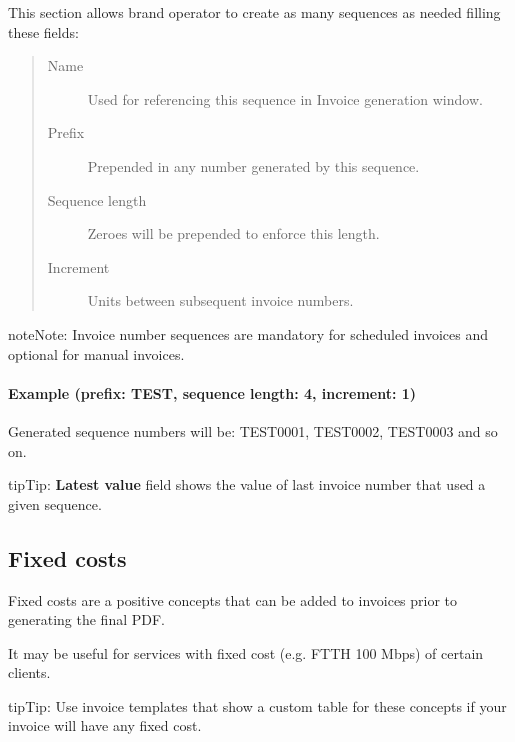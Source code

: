 \documentclass[letterpaper,10pt,english]{sphinxmanual}
\begin{document}
This section allows brand operator to create as many sequences as needed filling these fields:
\begin{quote}
\begin{description}
\item[{Name}] \leavevmode
Used for referencing this sequence in Invoice generation window.

\item[{Prefix}] \leavevmode
Prepended in any number generated by this sequence.

\item[{Sequence length}] \leavevmode
Zeroes will be prepended to enforce this length.

\item[{Increment}] \leavevmode
Units between subsequent invoice numbers.

\end{description}
\end{quote}

\begin{notice}{note}{Note:}
Invoice number sequences are mandatory for scheduled invoices and optional for manual invoices.
\end{notice}
\paragraph{Example (prefix: TEST, sequence length: 4, increment: 1)}

Generated sequence numbers will be: TEST0001, TEST0002, TEST0003 and so on.

\begin{notice}{tip}{Tip:}
\textbf{Latest value} field shows the value of last invoice number that used a given sequence.
\end{notice}


\subsection{Fixed costs}
\label{administration_portal/brand/invoicing/fixed_costs:fixed-costs}\label{administration_portal/brand/invoicing/fixed_costs::doc}\label{administration_portal/brand/invoicing/fixed_costs:id1}
Fixed costs are a positive concepts that can be added to invoices prior to generating the final PDF.

It may be useful for services with fixed cost (e.g. FTTH 100 Mbps) of certain clients.

\begin{notice}{tip}{Tip:}
Use invoice templates that show a custom table for these concepts if your invoice will have any fixed cost.
\end{notice}
\end{document}
